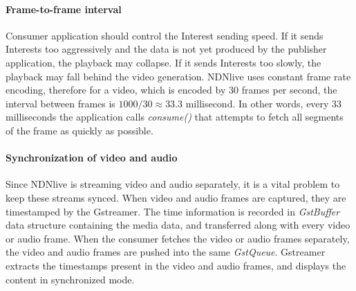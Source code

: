 \paragraph{Frame-to-frame interval} %
\label{par:consume_interval}
\vspace{0.3cm}
Consumer application should control the Interest sending speed. If it sends Interests too aggressively and the data is not yet produced by the publisher application, the playback may collapse. If it sends Interests too slowly, the playback may fall behind the video generation. NDNlive uses constant frame rate encoding, therefore for a video, which is encoded by 30 frames per second, the interval between frames is $1000/30 \approx {33.3}$ millisecond. In other words, every 33 milliseconds the application calls \textit{consume()} that attempts to fetch all segments of the frame as quickly as possible.



\paragraph{Synchronization of video and audio}
\label{par:sync}
\vspace{0.3cm}
Since NDNlive is streaming video and audio separately, it is a vital problem to keep these streams synced. When video and audio frames are captured, they are timestamped by the Gstreamer. The time information is recorded in \textit{GstBuffer} data structure containing the media data, and transferred along with every video or audio frame. When the consumer fetches the video or audio frames separately, the video and audio frames are pushed into the same \textit{GstQueue}. Gstreamer extracts the timestamps present in the video and audio frames, and displays the content in synchronized mode. 



